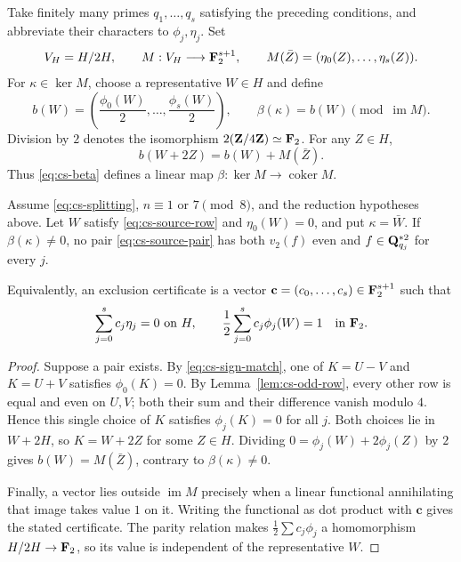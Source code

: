 Take finitely many primes $q_1,\ldots,q_s$ satisfying the preceding
conditions, and abbreviate their characters to $\phi_j,\eta_j$.  Set
\[
 V_H=H/2H,\qquad
 M:V_H\longrightarrow\mathbf F_2^{s+1},\qquad
 M(\bar Z)=(\eta_0(Z),\ldots,\eta_s(Z)).
\]
For $\kappa\in\ker M$, choose a representative $W\in H$ and define
\begin{equation}\label{eq:cs-beta}
 b(W)=\left(\frac{\phi_0(W)}2,\ldots,
                  \frac{\phi_s(W)}2\right),\qquad
 \beta(\kappa)=b(W)\pmod{\operatorname{im}M}.
\end{equation}
Division by $2$ denotes the isomorphism $2(\mathbf Z/4\mathbf Z)\simeq\mathbf F_2$.
For any $Z\in H$,
\begin{equation}\label{eq:cs-compensation}
 b(W+2Z)=b(W)+M(\bar Z).
\end{equation}
Thus \eqref{eq:cs-beta} defines a linear map
$\beta:\ker M\longrightarrow\operatorname{coker}M$.

\begin{theorem}
\label{thm:cs-matrix}
Assume \eqref{eq:cs-splitting}, $n\equiv1$ or $7\pmod8$, and the
reduction hypotheses above.  Let $W$ satisfy
\eqref{eq:cs-source-row} and $\eta_0(W)=0$, and put $\kappa=\bar W$.
If $\beta(\kappa)\ne0$, no pair \eqref{eq:cs-source-pair} has both
$v_2(f)$ even and $f\in\mathbf Q_{q_j}^{*2}$ for every $j$.

Equivalently, an exclusion certificate is a vector
$\mathbf c=(c_0,\ldots,c_s)\in\mathbf F_2^{s+1}$ such that
\[
 \sum_{j=0}^s c_j\eta_j=0\text{ on }H,
 \qquad
 \frac12\sum_{j=0}^s c_j\phi_j(W)=1\quad\text{in }\mathbf F_2.
\]
\end{theorem}
\begin{proof}
Suppose a pair exists.  By \eqref{eq:cs-sign-match}, one of $K=U-V$
and $K=U+V$ satisfies $\phi_0(K)=0$.  By
Lemma~\ref{lem:cs-odd-row}, every other row is equal and even on $U,V$;
both their sum and their difference vanish modulo $4$.  Hence this
single choice of $K$ satisfies $\phi_j(K)=0$ for all $j$.
Both choices lie in $W+2H$, so $K=W+2Z$ for some $Z\in H$.
Dividing $0=\phi_j(W)+2\phi_j(Z)$ by $2$ gives
$b(W)=M(\bar Z)$, contrary to $\beta(\kappa)\ne0$.

Finally, a vector lies outside $\operatorname{im}M$ precisely when a
linear functional annihilating that image takes value $1$ on it.
Writing the functional as dot product with $\mathbf c$ gives the stated
certificate.  The parity relation makes
$\frac12\sum c_j\phi_j$ a homomorphism $H/2H\to\mathbf F_2$, so its value is
independent of the representative $W$.
\end{proof}

